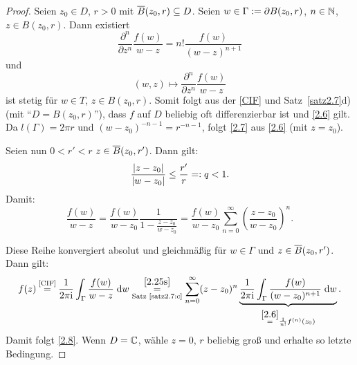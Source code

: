 \documentclass[a4paper,twoside,DIV15,BCOR12mm]{scrbook}
\begin{document}
\begin{proof}
Seien $z_0\in D$, $r > 0$ mit $\overline{B}(z_0,r)\subseteq D$. Seien $w\in\Gamma:= \partial B(z_0,r)$, $n\in\mathbb{N}$, $z\in B(z_0,r)$. Dann existiert
\[\frac{\partial^n}{\partial z^n}\frac{f(w)}{w-z} = n!\frac{f(w)}{(w-z)^{n+1}}\]
und
\[(w,z)\mapsto \frac{\partial^n}{\partial z^n}\frac{f(w)}{w-z}\]
ist stetig für $w\in T$, $z\in B(z_0,r)$. Somit folgt aus der \eqref{CIF} und Satz~\ref{satz2.7}d) (mit "`$D=B(z_0,r)$"'), dass $f$ auf $D$ beliebig oft differenzierbar ist und \eqref{2.6} gilt. Da $l(\Gamma) = 2\pi r$ und $(w-z_0)^{-n-1}=r^{-n-1}$, folgt \eqref{2.7} aus \eqref{2.6} (mit $z=z_0$).

Seien nun $0<r'<r$ $z\in\overline{B}(z_0,r')$. Dann gilt:
\[\frac{\left\lvert z-z_0\right\lvert}{\left\lvert w-z_0\right\lvert}\leq\frac{r'}{r}=: q < 1.\]
Damit:
\[\label{2.25s}\frac{f(w)}{w-z}=\frac{f(w)}{w-z_0}\frac{1}{1-\frac{z-z_0}{w-z_0}} = \frac{f(w)}{w-z_0}\sum_{n=0}^\infty\left(\frac{z-z_0}{w-z_0}\right)^n.\tag{$*$}\]

Diese Reihe konvergiert absolut und gleichmäßig für $w\in\Gamma$ und $z\in\overline{B}(z_0,r')$. Dann gilt:
\[f(z)\!\!\nach{=}{\eqref{CIF}}\!\! \frac{1}{2\pi\i}\integral{\Gamma}{}{\frac{f(w)}{w-z}}{w} \underset{\text{Satz~\ref{satz2.7:c}}}{\overset{\eqref{2.25s}}{=}} \sum_{n=0}^\infty (z-z_0)^n\underbrace{\frac{1}{2\pi\i}\integral{\Gamma}{}{\frac{f(w)}{(w-z_0)^{n+1}}}{w}}_{\overset{\eqref{2.6}}{=}\frac{1}{n!}f^{(n)}(z_0)}.\]
Damit folgt \eqref{2.8}. Wenn $D=\mathbb{C}$, wähle $z =0$, $r$ beliebig groß und erhalte so letzte Bedingung.
\end{proof}
\end{document}

